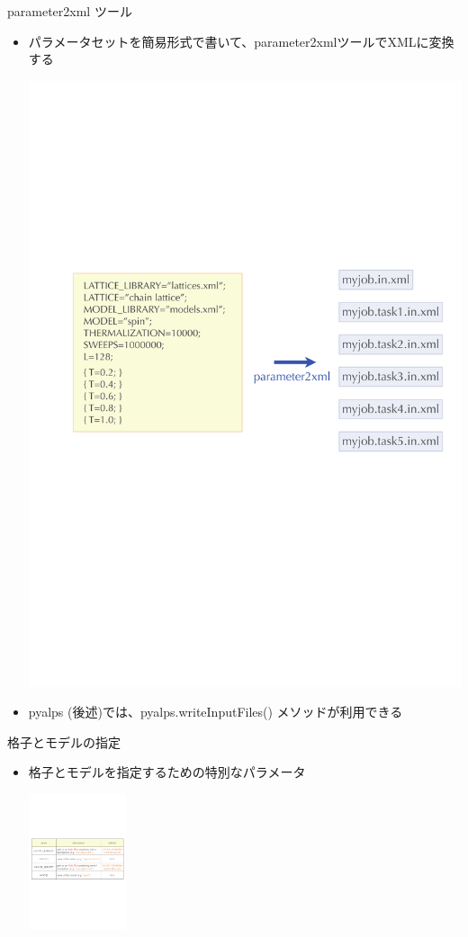 \begin{frame}{parameter2xml ツール}
  \begin{itemize}
  \item パラメータセットを簡易形式で書いて、parameter2xmlツールでXMLに変換する
  \begin{center}
    \includegraphics[height=.6\textheight]{simulation4.pdf}
  \end{center}
  \item pyalps (後述)では、pyalps.writeInputFiles() メソッドが利用できる
  \end{itemize}
\end{frame}

\begin{frame}{格子とモデルの指定}
  \begin{itemize}
  \item 格子とモデルを指定するための特別なパラメータ
  \begin{center}
    \includegraphics[height=4cm]{simulation5.pdf}
  \end{center}
  \end{itemize}
\end{frame}

